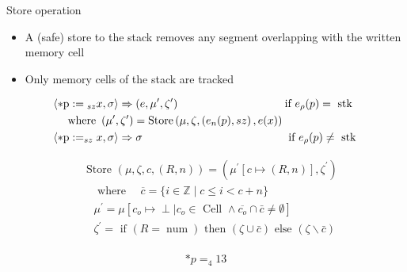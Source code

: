 \documentclass[aspectratio=169]{beamer}
\begin{document}
\begin{frame}{Store operation}
  \begin{itemize}
    \item A (safe) store to the stack removes any segment overlapping with the written memory cell
    \item Only memory cells of the stack are tracked
  \end{itemize}
  \begin{align*}
     & \left\langle * \mathrm{p}:={ }_{s z} x, \sigma\right\rangle \Rightarrow\left(e, \mu^{\prime}, \zeta^{\prime}\right) \quad \hspace{3cm} \text{if } e_\rho(p)=\text{ stk } \\
     & \hspace{0.4cm} \text{ where }\left(\mu^{\prime}, \zeta^{\prime}\right)=\operatorname{Store}\left(\mu, \zeta,\left(e_n(p), s z\right), e(x)\right)                        \\
     & \left\langle * \mathrm{p}:=_{s z} x, \sigma\right\rangle \Rightarrow \sigma \quad \hspace{4.3cm} \text{if } e_\rho(p) \neq \text{ stk }                                  \\
  \end{align*}

  \begin{minipage}{0.1\textwidth}

    \begin{align*}
       & \text { Store }(\mu, \zeta, c,(R, n))=\left(\mu^{\prime}[c \mapsto(R, n)], \zeta^{\prime}\right)                                    \\
       & \quad \text { where } \quad \overline{c}=\{i \in \mathbb{Z} \mid c \leq i<c+n\}                                                     \\
       & \quad \mu^{\prime}=\mu\left[c_o \mapsto \perp \mid c_o \in \text { Cell } \wedge \overline{c_o} \cap \bar{c} \neq \emptyset\right]  \\
       & \quad \zeta^{\prime}=\text { if }(R=\operatorname{num}) \text { then }(\zeta \cup \bar{c}) \text { else }(\zeta \backslash \bar{c}) \\
    \end{align*}
  \end{minipage}
  \vline
  \begin{minipage}{0.12\textwidth}
    $$*p=_4 13$$


\end{minipage}
\end{frame}
\end{document}
